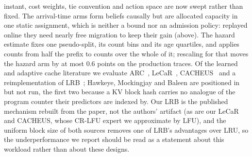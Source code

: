 instant, cost weights, tie convention and action space are now swept rather than fixed. The arrival-time
arms form beliefs causally but are allocated capacity in one static assignment, which is neither a bound
nor an admission policy: replayed online they need nearly free migration to keep their gain (above).
The hazard estimate fixes one pseudo-split, its count bins and its age quartiles, and applies counts from
half the prefix to counts over the whole of it; rescaling for that moves the hazard arm by at most 0.6 points on the production traces. Of the learned and adaptive cache literature we evaluate
ARC~\cite{S7_megiddo2003arc}, LeCaR~\cite{S8_vietri2018lecar}, CACHEUS~\cite{S9_rodriguez2021cacheus} and
a reimplementation of LRB~\cite{S6_song2020lrb}; Hawkeye, Mockingjay and Baleen are positioned in
 but not run, the first two because a KV block hash carries no analogue of the program
counter their predictors are indexed by. Our LRB is the
published mechanism rebuilt from the paper, not the authors' artifact (as are our LeCaR and CACHEUS, whose
CR-LFU expert we approximate by LFU), and the uniform block size of both sources removes one of LRB's
advantages over LRU, so the underperformance we report should be read as a statement about this workload
rather than about these designs.
